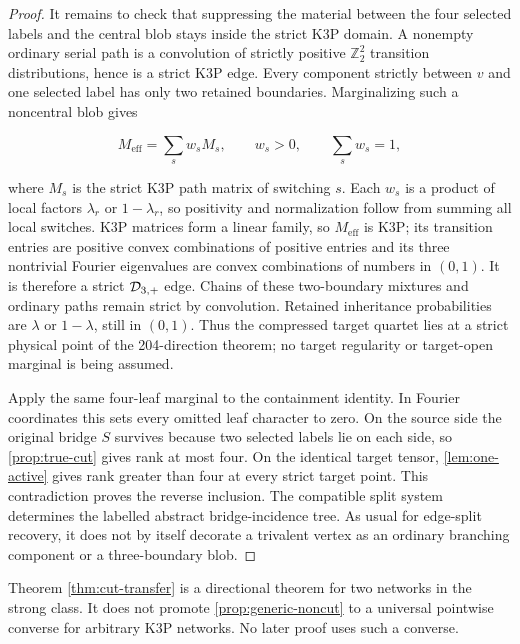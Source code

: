 \begin{proof}
It remains to check that suppressing the material between the four selected
labels and the central blob stays inside the strict K3P domain.  A nonempty
ordinary serial path is a convolution of strictly positive
\(\mathbb Z_2^2\) transition distributions, hence is a strict K3P edge.
Every component strictly between \(v\) and one selected label has only two
retained boundaries.  Marginalizing such a noncentral blob gives

\[
 M_{\mathrm{eff}}=\sum_s w_sM_s,
 \qquad w_s>0,\qquad \sum_s w_s=1,
\]

where \(M_s\) is the strict K3P path matrix of switching \(s\).  Each \(w_s\)
is a product of local factors \(\lambda_r\) or \(1-\lambda_r\), so positivity
and normalization follow from summing all local switches.  K3P matrices form
a linear family, so \(M_{\mathrm{eff}}\) is K3P; its transition entries are
positive convex combinations of positive entries and its three nontrivial
Fourier eigenvalues are convex combinations of numbers in \((0,1)\).  It is
therefore a strict \(\mathcal D_{3,+}\) edge.  Chains of these two-boundary mixtures
and ordinary paths remain strict by convolution.
Retained inheritance probabilities are \(\lambda\) or \(1-\lambda\), still
in \((0,1)\).  Thus the compressed target quartet lies at a strict physical
point of the 204-direction theorem; no target regularity or target-open
marginal is being assumed.

Apply the same four-leaf marginal to the containment identity.  In Fourier
coordinates this sets every omitted leaf character to zero.  On the source
side the original bridge \(S\) survives because two selected labels lie on
each side, so \cref{prop:true-cut} gives rank at most four.  On the identical
target tensor, \cref{lem:one-active} gives rank greater than four at every
strict target point.  This contradiction proves the reverse inclusion.  The
compatible split system determines the labelled abstract bridge-incidence
tree.  As usual for edge-split recovery, it does not by itself decorate a
trivalent vertex as an ordinary branching component or a three-boundary blob.
\end{proof}

\begin{remark}\label{rem:no-universal-cut}
Theorem \ref{thm:cut-transfer} is a directional theorem for two networks in
the strong class.  It does not promote \cref{prop:generic-noncut} to a
universal pointwise converse for arbitrary K3P networks.  No later proof uses
such a converse.
\end{remark}

